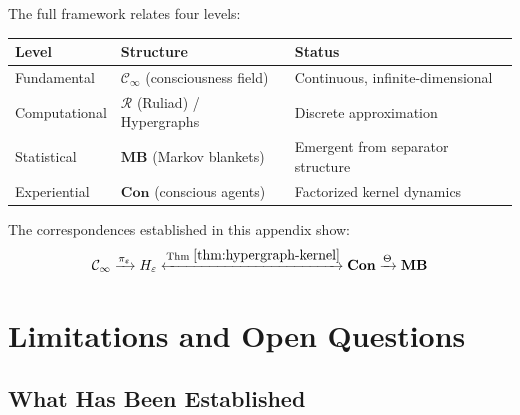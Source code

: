 \documentclass[11pt,a4paper]{article}
\theoremstyle{definition}
\theoremstyle{plain}
\theoremstyle{remark}
\newcommand{\Con}{\mathbf{Con}}
\newcommand{\MB}{\mathbf{MB}}
\begin{document}
The full framework relates four levels:

\begin{center}
\begin{tabular}{llp{6cm}}
\toprule
\textbf{Level} & \textbf{Structure} & \textbf{Status} \\
\midrule
Fundamental & $\mathcal{C}_\infty$ (consciousness field) & Continuous, infinite-dimensional \\
Computational & $\mathcal{R}$ (Ruliad) / Hypergraphs & Discrete approximation \\
Statistical & $\MB$ (Markov blankets) & Emergent from separator structure \\
Experiential & $\Con$ (conscious agents) & Factorized kernel dynamics \\
\bottomrule
\end{tabular}
\end{center}

The correspondences established in this appendix show:
\[
\mathcal{C}_\infty \xrightarrow{\pi_\varepsilon} H_\varepsilon \xleftrightarrow{\text{Thm }\ref{thm:hypergraph-kernel}} \Con \xrightarrow{\Theta} \MB
\]

\section{Limitations and Open Questions}

\subsection{What Has Been Established}
\end{document}
